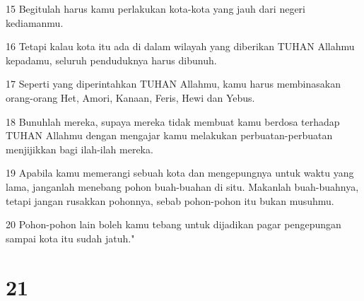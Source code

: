 \par 15 Begitulah harus kamu perlakukan kota-kota yang jauh dari negeri kediamanmu.
\par 16 Tetapi kalau kota itu ada di dalam wilayah yang diberikan TUHAN Allahmu kepadamu, seluruh penduduknya harus dibunuh.
\par 17 Seperti yang diperintahkan TUHAN Allahmu, kamu harus membinasakan orang-orang Het, Amori, Kanaan, Feris, Hewi dan Yebus.
\par 18 Bunuhlah mereka, supaya mereka tidak membuat kamu berdosa terhadap TUHAN Allahmu dengan mengajar kamu melakukan perbuatan-perbuatan menjijikkan bagi ilah-ilah mereka.
\par 19 Apabila kamu memerangi sebuah kota dan mengepungnya untuk waktu yang lama, janganlah menebang pohon buah-buahan di situ. Makanlah buah-buahnya, tetapi jangan rusakkan pohonnya, sebab pohon-pohon itu bukan musuhmu.
\par 20 Pohon-pohon lain boleh kamu tebang untuk dijadikan pagar pengepungan sampai kota itu sudah jatuh."

\chapter{21}

